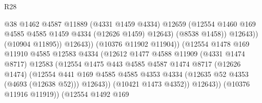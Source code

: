 \begin{lexlean}{R28}
\begin{coremodule}
                                            @38
                                            @1462
                                            @4587
                                            @11889
                                            (@4331 @1459 @4334)
                                            @12659
                                            (@12554
                                              @1460
                                              @169
                                              @4585
                                              @4585
                                              @1459
                                              @4334
                                              (@12626 @1459)
                                              @12643)
                                            (@8538 @1458))
                                          @12643))
                                      (@10904 @11895))
                                    @12643))
                                (@10376 @11902 @11904))
                              (@12554
                                @1478
                                @169
                                @11910
                                @4585
                                @12583
                                @4334
                                (@12612
                                  @1477
                                  @4588
                                  @11909
                                  (@4331 @1474 @8717)
                                  @12583
                                  (@12554
                                    @1475
                                    @443
                                    @4585
                                    @4587
                                    @1474
                                    @8717
                                    (@12626 @1474)
                                    (@12554
                                      @441
                                      @169
                                      @4585
                                      @4585
                                      @4353
                                      @4334
                                      (@12635 @52 @4353 (@4693 (@12638 @52)))
                                      @12643))
                                  (@10421 @1473 @4352))
                                @12643))
                            (@10376 @11916 @11919))
                          (@12554
                            @1492
                            @169

\end{coremodule}
\end{lexlean}
